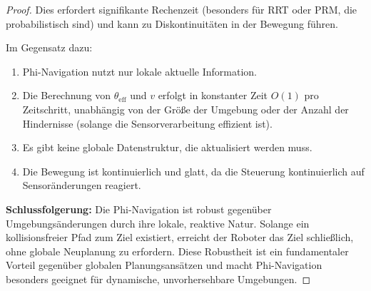 ﻿\documentclass[a4paper,12pt]{article}
\theoremstyle{definition}
\begin{document}
\begin{proof}
Dies erfordert signifikante Rechenzeit (besonders für RRT oder PRM, die probabilistisch sind) und kann zu Diskontinuitäten in der Bewegung führen.

Im Gegensatz dazu:
\begin{enumerate}
\item Phi-Navigation nutzt nur lokale aktuelle Information.
\item Die Berechnung von $\theta_{\text{eff}}$ und $v$ erfolgt in konstanter Zeit $O(1)$ pro Zeitschritt, unabhängig von der Größe der Umgebung oder der Anzahl der Hindernisse (solange die Sensorverarbeitung effizient ist).
\item Es gibt keine globale Datenstruktur, die aktualisiert werden muss.
\item Die Bewegung ist kontinuierlich und glatt, da die Steuerung kontinuierlich auf Sensoränderungen reagiert.
\end{enumerate}

\textbf{Schlussfolgerung:} Die Phi-Navigation ist robust gegenüber Umgebungsänderungen durch ihre lokale, reaktive Natur. Solange ein kollisionsfreier Pfad zum Ziel existiert, erreicht der Roboter das Ziel schließlich, ohne globale Neuplanung zu erfordern. Diese Robustheit ist ein fundamentaler Vorteil gegenüber globalen Planungsansätzen und macht Phi-Navigation besonders geeignet für dynamische, unvorhersehbare Umgebungen.
\end{proof}
\end{document}
